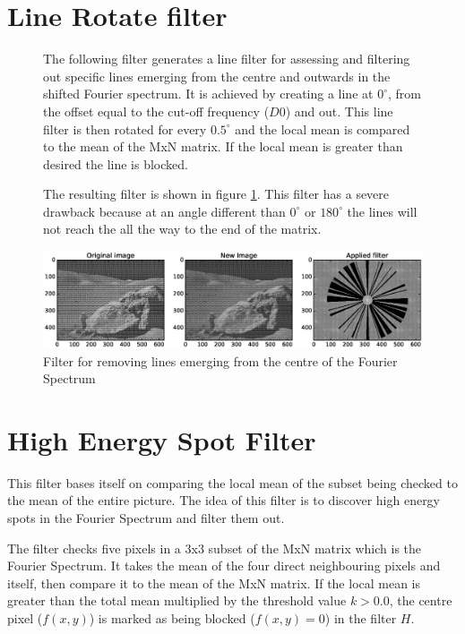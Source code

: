 \section{Line Rotate filter}
\begin{figure}[h]
\begin{minipage}{0.57\linewidth}
The following filter generates a line filter for assessing and filtering out
specific lines emerging from the centre and outwards in the shifted Fourier
spectrum. It is achieved by creating a line at $0^\circ$, from the offset equal
to the cut-off frequency ($D0$) and out.  This line filter is then rotated for
every $0.5^\circ$ and the local mean is compared to the mean of the MxN matrix.
If the local mean is greater than desired the line is blocked.

The resulting filter is shown in figure \ref{fig:fltr_line_rotate}.  This filter
has a severe drawback because at an angle different than $0^\circ$ or
$180^\circ$ the lines will not reach the all the way to the end of the matrix.
\end{minipage}\hfill
\begin{minipage}{0.4\linewidth}
	\centering
	\includegraphics[width=1\linewidth,clip,trim={650 110 75 110}]{pics/moon_fltr_line_rotate}
	\caption{Filter for removing lines emerging from the centre of the Fourier
	Spectrum}
	\label{fig:fltr_line_rotate}
\end{minipage}
\end{figure}



\section{High Energy Spot Filter}
This filter bases itself on comparing the local mean of the subset being checked
to the mean of the entire picture. The idea of this filter is to discover
high energy spots in the Fourier Spectrum and filter them out.

The filter checks five pixels in a 3x3 subset of the MxN matrix which is the
Fourier Spectrum. It takes the mean of the four direct neighbouring pixels and
itself, then compare it to the mean of the MxN matrix.  If the local mean is
greater than the total mean multiplied by the threshold value $k>0.0$, the
centre pixel ($f(x,y)$) is marked as being blocked ($f(x,y)=0$) in the filter $H$.

